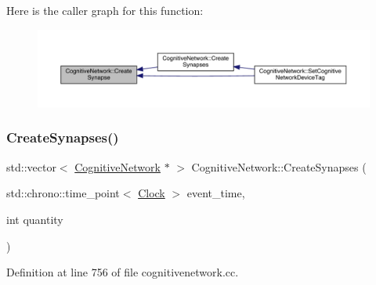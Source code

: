 Here is the caller graph for this function\+:
\nopagebreak
\begin{figure}[H]
\begin{center}
\leavevmode
\includegraphics[width=350pt]{class_cognitive_network_ade8e9295b35790b136dca9084a1b7aa9_icgraph}
\end{center}
\end{figure}
\mbox{\label{class_cognitive_network_ae6ae16f401e7699032ac9459132763c0}} 
\subsubsection{\texorpdfstring{Create\+Synapses()}{CreateSynapses()}}
{\footnotesize\ttfamily std\+::vector$<$ \hyperlink{class_cognitive_network}{Cognitive\+Network} $\ast$ $>$ Cognitive\+Network\+::\+Create\+Synapses (\begin{DoxyParamCaption}\item[{std\+::chrono\+::time\+\_\+point$<$ \hyperlink{universe_8h_a0ef8d951d1ca5ab3cfaf7ab4c7a6fd80}{Clock} $>$}]{event\+\_\+time,  }\item[{int}]{quantity }\end{DoxyParamCaption})}



Definition at line 756 of file cognitivenetwork.\+cc.

